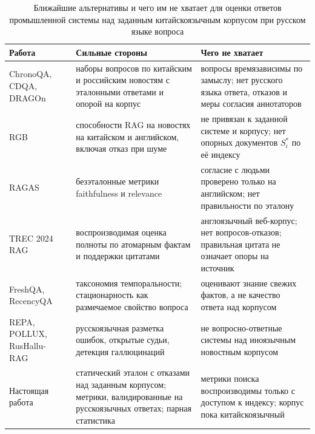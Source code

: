 \documentclass{article}
\begin{document}
\begin{table}[t]
  \caption{Ближайшие альтернативы и чего им не хватает для оценки ответов промышленной системы над заданным китайскоязычным корпусом при русском языке вопроса}
  \label{tab:alt}
  \centering
  \small
  \begin{tabular}{@{}p{}p{}p{}@{}}
    \toprule
    Работа & Сильные стороны & Чего не хватает \\
    \midrule
    ChronoQA, CDQA, DRAGOn~\cite{chen2025chronoqa,xu2024cdqa,chernogorskii2025dragon} & наборы вопросов по китайским и российским новостям с эталонными ответами и опорой на корпус & вопросы времязависимы по замыслу; нет русского языка ответа, отказов и меры согласия аннотаторов \\
    RGB~\cite{chen2023rgb} & способности RAG на новостях на китайском и английском, включая отказ при шуме & не привязан к заданной системе и корпусу; нет опорных документов $S^*_i$ по её индексу \\
    RAGAS~\cite{es2023ragas} & безэталонные метрики faithfulness и relevance & согласие с людьми проверено только на английском; нет правильности по эталону \\
    TREC 2024 RAG~\cite{pradeep2025nugget,thakur2025assessing} & воспроизводимая оценка полноты по атомарным фактам и поддержки цитатами & англоязычный веб-корпус; нет вопросов-отказов; правильная цитата не означает опоры на источник~\cite{wallat2025correctness} \\
    FreshQA, RecencyQA~\cite{vu2023freshllms,piryani2026recency} & таксономия темпоральности; стационарность как размечаемое свойство вопроса & оценивают знание свежих фактов, а не качество ответа над корпусом \\
    REPA, POLLUX, RusHallu-RAG~\cite{pugachev2025repa,martynov2025pollux,sadkovskii2026rushallu} & русскоязычная разметка ошибок, открытые судьи, детекция галлюцинаций & не вопросно-ответные системы над иноязычным новостным корпусом \\
    Настоящая работа & статический эталон с отказами над заданным корпусом; метрики, валидированные на русскоязычных ответах; парная статистика & метрики поиска воспроизводимы только с доступом к индексу; корпус пока китайскоязычный \\
    \bottomrule
  \end{tabular}
\end{table}
\end{document}
